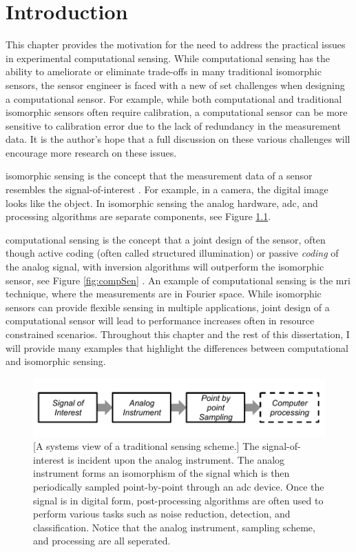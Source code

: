 \chapter{Introduction}\label{chap:Introduction}


This chapter provides the motivation for the need to address the practical issues in experimental computational sensing. While computational sensing has the ability to ameliorate or eliminate trade-offs in many traditional isomorphic sensors, the sensor engineer is faced with a new of set challenges when designing a computational sensor. For example, while both computational and traditional isomorphic sensors often require calibration, a computational sensor can be more sensitive to calibration error due to the lack of redundancy in the measurement data. It is the author's hope that a full discussion on these various challenges will encourage more research on these issues. 

\Gls{isomorphic sensing} is the concept that the measurement data of a sensor resembles the signal-of-interest \cite{brady2009optical}. For example, in a camera, the digital image looks like the object. In isomorphic sensing the analog hardware, \acrfull{adc}, and processing algorithms are separate components, see Figure \ref{fig:isomorphicsesingflowchart}.  

\Gls{computational sensing} is the concept that a joint design of the sensor, often though active \gls{coding} (often called structured illumination) or passive \emph{coding} of the analog signal, with inversion algorithms will outperform the isomorphic sensor, see Figure \ref{fig:compSen} \cite{neifeld2006taskSpecificSensing}. An example of computational sensing is the \gls{mri} technique, where the measurements are in Fourier space. While \gls{isomorphic} sensors can provide flexible sensing in multiple applications, joint design of a \gls{computational sensor} will lead to performance increases often in resource constrained scenarios. Throughout this chapter and the rest of this dissertation, I will provide many examples that highlight the differences between computational and isomorphic sensing. 



\begin{figure}
    \centering
    \includegraphics[scale=1]{isomorphicsensorflowchart}
    [A systems view of a traditional sensing scheme.]{ The signal-of-interest is incident upon the analog instrument. The analog instrument forms an isomorphism of the signal which is then periodically sampled point-by-point through an \gls{adc} device. Once the signal is in digital form, post-processing algorithms are often used to perform various tasks such as noise reduction, detection, and classification. Notice that the analog instrument, sampling scheme, and processing are all seperated. }
    \label{fig:isomorphicsesingflowchart}
\end{figure}


